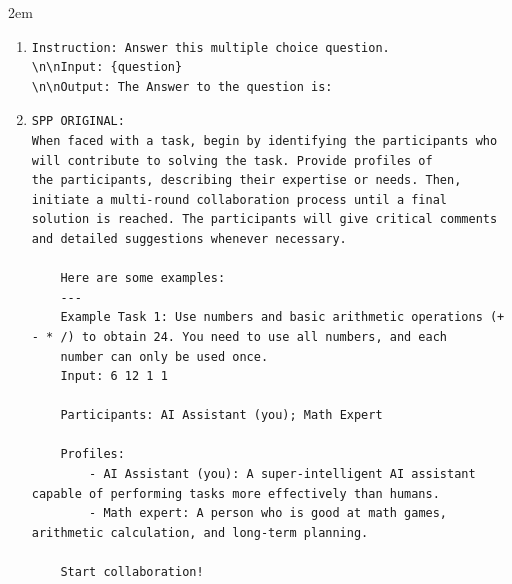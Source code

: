 \begin{adjustwidth}{2em}{}
\begin{enumerate}
\item[SIMPLE:]
\begin{verbatim}
Instruction: Answer this multiple choice question.
\n\nInput: {question}
\n\nOutput: The Answer to the question is:
\end{verbatim}

\item[SPP:]
\begin{verbatim}
SPP ORIGINAL: 
When faced with a task, begin by identifying the participants who will contribute to solving the task. Provide profiles of  
the participants, describing their expertise or needs. Then, initiate a multi-round collaboration process until a final  
solution is reached. The participants will give critical comments and detailed suggestions whenever necessary.

    Here are some examples:
    ---
    Example Task 1: Use numbers and basic arithmetic operations (+ - * /) to obtain 24. You need to use all numbers, and each 
    number can only be used once.
    Input: 6 12 1 1

    Participants: AI Assistant (you); Math Expert

    Profiles:
        - AI Assistant (you): A super-intelligent AI assistant capable of performing tasks more effectively than humans.
        - Math expert: A person who is good at math games, arithmetic calculation, and long-term planning.

    Start collaboration!


\end{verbatim}
\end{enumerate}
\end{adjustwidth}
